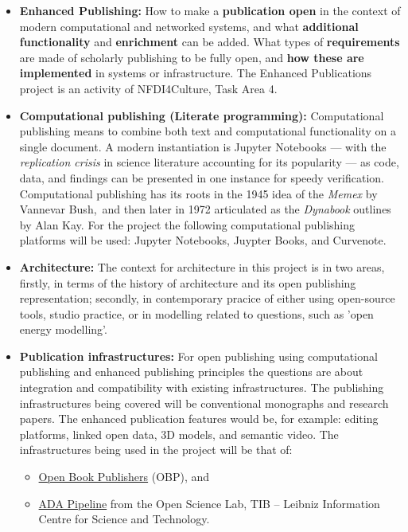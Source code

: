 \documentclass{article}
\begin{document}
\begin{itemize}
\item \textbf{Enhanced Publishing:} How to make a \textbf{publication open} in the context of modern computational and networked systems, and what \textbf{additional functionality} and \textbf{enrichment} can be added. What types of \textbf{requirements }are made of scholarly publishing to be fully open, and \textbf{how these are implemented }in systems or infrastructure. The Enhanced Publications project is an activity of NFDI4Culture, Task Area 4. \autocite{WorthingtonSimon20220303}


\item \textbf{Computational publishing (Literate programming):} Computational publishing means to combine both text and computational functionality on a single document. A modern instantiation is Jupyter Notebooks — with the \emph{replication crisis} in science literature accounting for its popularity — as code, data, and findings can be presented in one instance for speedy verification. Computational publishing has its roots in the 1945 idea of the \emph{Memex} by Vannevar Bush, and then later in 1972 articulated as the \emph{Dynabook} outlines by Alan Kay. \autocite{OdewahnAndrew20210619T14:43:08Z} For the project the following computational publishing platforms will be used: Jupyter Notebooks, Juypter Books, and Curvenote.


\item \textbf{Architecture:} The context for architecture in this project is in two areas, firstly, in terms of the history of architecture and its open publishing representation; secondly, in contemporary pracice of either using open-source tools, studio practice, or in modelling related to questions, such as 'open energy modelling'.


\item \textbf{Publication infrastructures:} For open publishing using computational publishing and enhanced publishing principles the questions are about integration and compatibility with existing infrastructures. The publishing infrastructures being covered will be conventional monographs and research papers. The enhanced publication features would be, for example: editing platforms, linked open data, 3D models, and semantic video. The infrastructures being used in the project will be that of: 

\begin{itemize}
\item \href{https://github.com/OpenBookPublishers}{Open Book Publishers} (OBP), and  


\item \href{https://github.com/TIBHannover/ADA-Reference-Publication}{ADA Pipeline} from the Open Science Lab, TIB – Leibniz Information Centre for Science and Technology.


\end{itemize}

\end{itemize}
\end{document}
